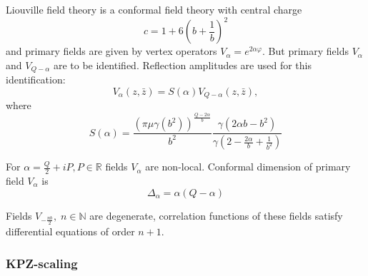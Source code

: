 \documentclass[12pt]{article}
\begin{document}
Liouville field theory is a conformal field theory with central charge
\begin{equation}
  \label{eq:19}
  c=1+6\left(b+\frac{1}{b}\right)^{2}
\end{equation}
and primary fields are given by vertex operators $V_{\alpha}=e^{2\alpha\varphi}$. But primary fields
$V_{\alpha}$ and $V_{Q-\alpha}$ are to be identified. 
Reflection amplitudes are used for this identification:
\begin{equation}
  \label{eq:87}
  V_{\alpha}(z,\bar z)=S(\alpha) V_{Q-\alpha}(z,\bar z),
\end{equation}
where
\begin{equation}
  \label{eq:88}
  S(\alpha)=\frac{\left(\pi\mu\gamma(b^{2})\right)^{\frac{Q-2\alpha}{b}}}{b^{2}}
  \frac{\gamma(2\alpha b -b^{2})}{\gamma\left(2-\frac{2\alpha}{b}+\frac{1}{b^{2}}\right)}
\end{equation}


For $\alpha=\frac{Q}{2}+i P, P\in \mathbb{R}$
fields $V_{\alpha}$ are non-local. Conformal dimension of primary field $V_{\alpha}$ is
\begin{equation}
  \label{eq:32}
  \Delta_{\alpha}=\alpha(Q-\alpha)
\end{equation}

Fields $V_{-\frac{nb}{2}}, \; n\in \mathbb{N}$ are degenerate, correlation functions of these fields
satisfy differential equations of order $n+1$. 

\subsubsection{KPZ-scaling}
\label{sec:kpz-scaling}
\end{document}
